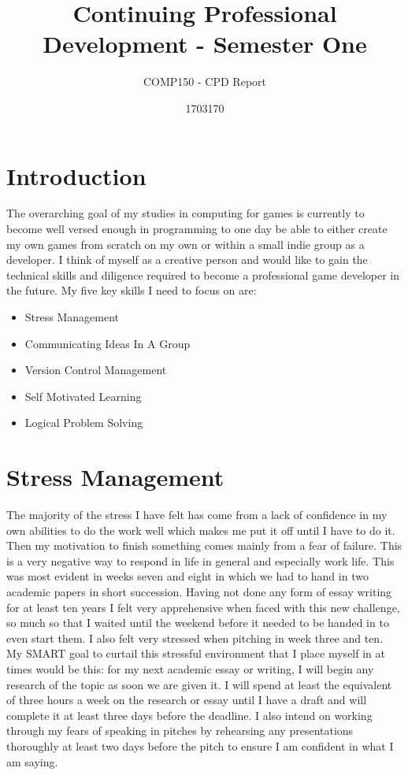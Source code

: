 \documentclass{scrartcl}
\title{Continuing Professional Development - Semester One}
\subtitle{COMP150 - CPD Report}
\author{1703170}
\begin{document}
\maketitle

\section{Introduction}

The overarching goal of my studies in computing for games is currently to become well versed enough in programming to one day be able to either create my own games from scratch on my own or within a small indie group as a developer. I think of myself as a creative person and would like to gain the technical skills and diligence required to become a professional game developer in the future. My five key skills I need to focus on are:

\begin{itemize}
  \item Stress Management
  \item Communicating Ideas In A Group
  \item Version Control Management
  \item Self Motivated Learning
  \item Logical Problem Solving
\end{itemize}

\section{Stress Management}

The majority of the stress I have felt has come from a lack of confidence in my own abilities to do the work well which makes me put it off until I have to do it. Then my motivation to finish something comes mainly from a fear of failure. This is a very negative way to respond in life in general and especially work life. This was most evident in weeks seven and eight in which we had to hand in two academic papers in short succession. Having not done any form of essay writing for at least ten years I felt very apprehensive when faced with this new challenge, so much so that I waited until the weekend before it needed to be handed in to even start them. I also felt very stressed when pitching in week three and ten. 
\\
My SMART goal to curtail this stressful environment that I place myself in at times would be this: for my next academic essay or writing, I will begin any research of the topic as soon we are given it. I will spend at least the equivalent of three hours a week on the research or essay until I have a draft and will complete it at least three days before the deadline. I also intend on working through my fears of speaking in pitches by rehearsing any presentations thoroughly at least two days before the pitch to ensure I am confident in what I am saying.
\end{document}
